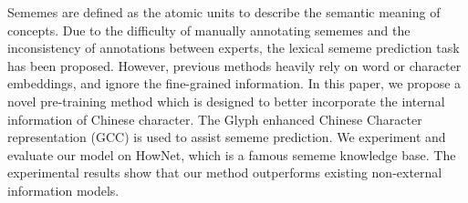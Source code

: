 Sememes are defined as the atomic units to describe the semantic meaning of concepts. Due to the difficulty of manually annotating sememes and the inconsistency of annotations between experts, the lexical sememe prediction task has been proposed. However, previous methods heavily rely on word or character embeddings, and ignore the fine-grained information. In this paper, we propose a novel pre-training method which is designed to better incorporate the internal information of Chinese character. The Glyph enhanced Chinese Character representation (GCC) is used to assist sememe prediction. We experiment and evaluate our model on HowNet, which is a famous sememe knowledge base. The experimental results show that our method outperforms existing non-external information models.
